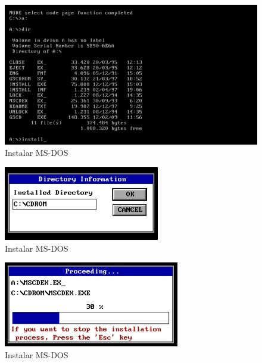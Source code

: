 \documentclass{report}
\begin{document}
\begin{figure}
\centering
\includegraphics[width=\textwidth]{Screenshot_22.png}
\caption{Instalar MS-DOS}
\label{fig:22}
\end{figure}

\begin{figure}
\centering
\includegraphics[width=\textwidth]{Screenshot_23.png}
\caption{Instalar MS-DOS}
\label{fig:23}
\end{figure}

\begin{figure}
\centering
\includegraphics[width=\textwidth]{Screenshot_24.png}
\caption{Instalar MS-DOS}
\label{fig:24}
\end{figure}
\end{document}
